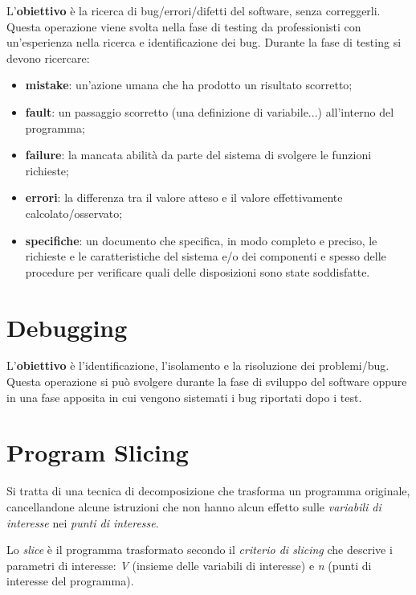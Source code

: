 \documentclass[a4paper, 10pt]{book}
\begin{document}
L'\textbf{obiettivo} è la ricerca di bug/errori/difetti del software, senza correggerli. Questa operazione viene svolta nella fase di testing da professionisti con un'esperienza nella ricerca e identificazione dei bug.
\newline
\newline
\noindent
Durante la fase di testing si devono ricercare:
\begin{itemize}
	\item \textbf{mistake}: un'azione umana che ha prodotto un risultato scorretto;
	\item \textbf{fault}: un passaggio scorretto (una definizione di variabile...) all'interno del programma;
	\item \textbf{failure}: la mancata abilità da parte del sistema di svolgere le funzioni richieste;
	\item \textbf{errori}: la differenza tra il valore atteso e il valore effettivamente calcolato/osservato;
	\item \textbf{specifiche}: un documento che specifica, in modo completo e preciso, le richieste e le caratteristiche del sistema e/o dei componenti e spesso delle procedure per verificare quali delle disposizioni sono state soddisfatte.
\end{itemize}

\section{Debugging}

L'\textbf{obiettivo} è l'identificazione, l'isolamento e la risoluzione dei problemi/bug. Questa operazione si può svolgere durante la fase di sviluppo del software oppure in una fase apposita in cui vengono sistemati i bug riportati dopo i test.

\section{Program Slicing}
Si tratta di una tecnica di decomposizione che trasforma un programma originale, cancellandone alcune istruzioni che non hanno alcun effetto sulle \textit{variabili di interesse} nei \textit{punti di interesse}.

Lo \textit{slice} è il programma trasformato secondo il \textit{criterio di slicing} che descrive i parametri di interesse: \textit{V} (insieme delle variabili di interesse) e \textit{n} (punti di interesse del programma).
\end{document}
